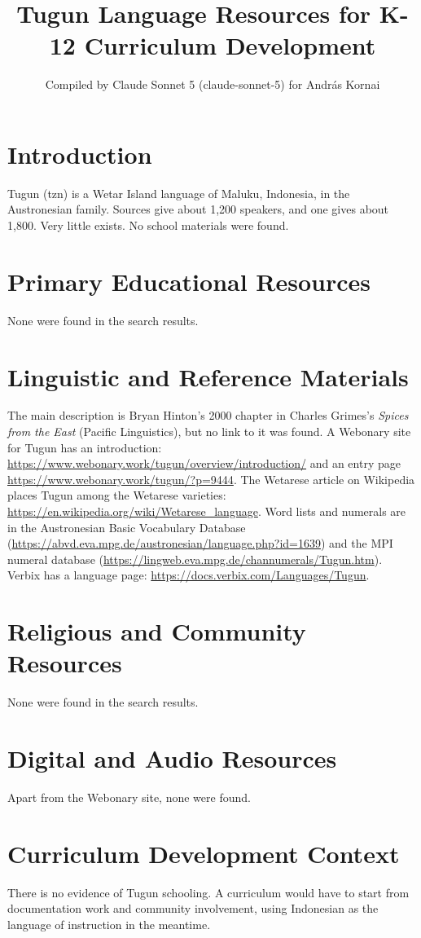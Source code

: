 \documentclass[12pt]{article}
\title{Tugun Language Resources for K-12 Curriculum Development}
\author{Compiled by Claude Sonnet 5 (claude-sonnet-5) for Andr\'as Kornai}
\date{}
\begin{document}
\maketitle
\section{Introduction}
Tugun (tzn) is a Wetar Island language of Maluku, Indonesia, in the Austronesian family. Sources give about 1,200 speakers, and one gives about 1,800. Very little exists. No school materials were found.
\section{Primary Educational Resources}
None were found in the search results.
\section{Linguistic and Reference Materials}
The main description is Bryan Hinton's 2000 chapter in Charles Grimes's \emph{Spices from the East} (Pacific Linguistics), but no link to it was found. A Webonary site for Tugun has an introduction: \url{https://www.webonary.work/tugun/overview/introduction/} and an entry page \url{https://www.webonary.work/tugun/?p=9444}. The Wetarese article on Wikipedia places Tugun among the Wetarese varieties: \url{https://en.wikipedia.org/wiki/Wetarese_language}. Word lists and numerals are in the Austronesian Basic Vocabulary Database (\url{https://abvd.eva.mpg.de/austronesian/language.php?id=1639}) and the MPI numeral database (\url{https://lingweb.eva.mpg.de/channumerals/Tugun.htm}). Verbix has a language page: \url{https://docs.verbix.com/Languages/Tugun}.
\section{Religious and Community Resources}
None were found in the search results.
\section{Digital and Audio Resources}
Apart from the Webonary site, none were found.
\section{Curriculum Development Context}
There is no evidence of Tugun schooling. A curriculum would have to start from documentation work and community involvement, using Indonesian as the language of instruction in the meantime.
\end{document}
